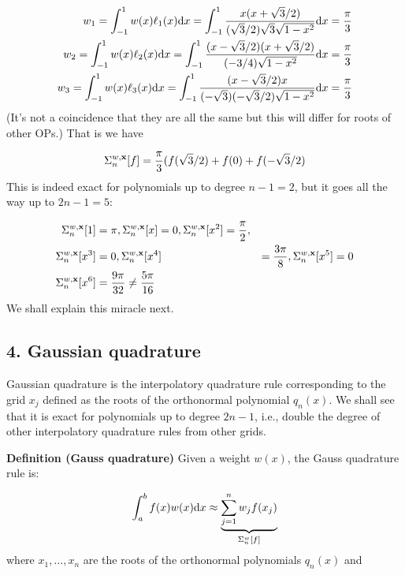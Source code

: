\documentclass[12pt,a4paper]{article}
\begin{document}
\begin{align*}
w_1 = \int_{-1}^1 w(x) \ensuremath{\ell}_1(x) {\rm d}x = \int_{-1}^1 {x(x+\sqrt{3}/2) \over (\sqrt{3}/2) \sqrt{3} \sqrt{1-x^2}}{\rm d}x = {\ensuremath{\pi} \over 3} \\
w_2 = \int_{-1}^1 w(x) \ensuremath{\ell}_2(x) {\rm d}x = \int_{-1}^1 {(x-\sqrt{3}/2)(x+\sqrt{3}/2) \over (-3/4)\sqrt{1-x^2}}{\rm d}x = {\ensuremath{\pi} \over 3} \\
w_3 = \int_{-1}^1 w(x) \ensuremath{\ell}_3(x) {\rm d}x = \int_{-1}^1 {(x-\sqrt{3}/2) x \over (-\sqrt{3})(-\sqrt{3}/2) \sqrt{1-x^2}}{\rm d}x = {\ensuremath{\pi} \over 3}
\end{align*}
(It's not a coincidence that they are all the same but this will differ for roots of other OPs.)  That is we have

\[
\ensuremath{\Sigma}_n^{w,\mathbf{x}}[f]  = {\ensuremath{\pi} \over 3}(f(\sqrt{3}/2) + f(0) + f(-\sqrt{3}/2)
\]
This is indeed exact for polynomials up to degree $n-1=2$, but it goes all the way up to $2n-1 = 5$:


\begin{align*}
\ensuremath{\Sigma}_n^{w,\mathbf{x}}[1] &= \ensuremath{\pi}, \ensuremath{\Sigma}_n^{w,\mathbf{x}}[x] = 0, \ensuremath{\Sigma}_n^{w,\mathbf{x}}[x^2] = {\ensuremath{\pi} \over 2}, \\
\ensuremath{\Sigma}_n^{w,\mathbf{x}}[x^3] &= 0, \ensuremath{\Sigma}_n^{w,\mathbf{x}}[x^4] &= {3 \ensuremath{\pi} \over 8}, \ensuremath{\Sigma}_n^{w,\mathbf{x}}[x^5] = 0 \\
\ensuremath{\Sigma}_n^{w,\mathbf{x}}[x^6] &= {9 \ensuremath{\pi} \over 32} \ensuremath{\ne} {5 \ensuremath{\pi} \over 16}
\end{align*}
We shall explain this miracle next.

\subsection{4. Gaussian quadrature}
Gaussian quadrature is the interpolatory quadrature rule corresponding to the grid $x_j$ defined as the roots of the orthonormal polynomial $q_n(x)$. We shall see that it is exact for polynomials up to degree $2n-1$, i.e., double the degree of other interpolatory quadrature rules from other grids.

\textbf{Definition (Gauss quadrature)} Given a weight $w(x)$, the Gauss quadrature rule is:

\[
\ensuremath{\int}_a^b f(x)w(x) {\rm d}x \ensuremath{\approx} \underbrace{\ensuremath{\sum}_{j=1}^n w_j f(x_j)}_{\ensuremath{\Sigma}_n^w[f]}
\]
where $x_1,\ensuremath{\ldots},x_n$ are the roots of the orthonormal polynomials $q_n(x)$ and 
\end{document}
